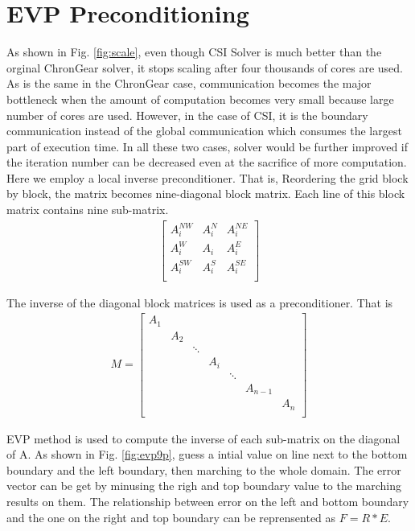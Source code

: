 \documentclass{sig-alternate}
\begin{document}
\section{EVP Preconditioning} \label{se:evp}
As shown in Fig. \ref{fig:scale}, even though CSI Solver is much better than the orginal ChronGear solver, it stops scaling after four thousands of cores are used.
As is the same in the ChronGear case, communication becomes the major bottleneck when the amount of computation becomes very small because large number of cores are used. 
However, in the case of CSI, it is the boundary communication instead of the global communication which consumes the largest part of execution time. 
In all these two cases, solver would be further improved if the iteration number can be decreased even at the sacrifice of more computation. \\
Here we employ a local inverse preconditioner. That is, 
Reordering the grid block by block, the matrix becomes nine-diagonal block matrix. 
Each line of this block matrix contains nine sub-matrix. 
\begin{eqnarray*}
    \left [
        \begin{array}{ccc}
        A_i^{NW} &  A_i^N & A_i^{NE} \\
        A_i^{W} &  A_i &  A_i^{E} \\
        A_i^{SW} &  A_i^S & A_i^{SE} \\
    \end{array}
    \right ]
\end{eqnarray*}

The inverse of the diagonal block matrices is used as a preconditioner. That is 
\begin{eqnarray*}
M=    \left [
        \begin{array}{ccccccc}
        A_1 &   &   &   &   &   &    \\
         &  A_2 &   &   &   &   &   \\
         & &\ddots  &   &   &   &   \\
        &   &   & A_i  &   &   &    \\
        &   &   &   & \ddots  &   &  \\ 
        &   &   &   &   &  A_{n-1} &   \\
        &   &   &   &   &   & A_{n} \\
    \end{array}
    \right ]
\end{eqnarray*}

EVP method is used to compute the inverse of each sub-matrix on the diagonal of A. 
As shown in Fig. \ref{fig:evp9p}, guess a intial value on line next to the bottom boundary and the left boundary, then marching to the whole domain. The error vector can be get by minusing the righ and top boundary value to the marching results on them. 
The relationship between error on the left and bottom boundary and the one on the right and top boundary can be reprensented as $F=R*E$. 
\end{document}
